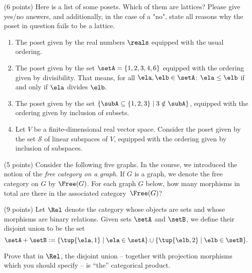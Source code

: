 \documentclass[paper=8.125in:10.250in,pagesize=pdftex,
    headinclude=false,footinclude=false,oneside,egregdoesnotlikesansseriftitles]{kaobook}
\begin{document}
\begin{gradedexercise}\label{ex:LatticeCheck}
(6 points) Here is a list of some posets. Which of them are lattices? 
Please give yes/no answers, and additionally, in the case of a "no", state all reasons why the poset in question fails to be a lattice. 
\begin{enumerate}
\item The poset given by the real numbers $\reals$ equipped with the usual ordering. 
\item The poset given by the set $\setA = \{ 1, 2, 3, 4, 6\}$ equipped with the ordering given by divisibility. That means, for all $\ela, \elb \in \setA$: $\ela \leq \elb$ if and only if $\ela$ divides $\elb.$ 
\item The poset given by the set $\{ \subA \subseteq \{1, 2 , 3 \} \mid 3 \notin \subA \}$, equipped with the ordering given by inclusion of subsets. 
\item Let $V$ be a finite-dimensional real vector space. Consider the poset given by the set $\mathcal{S}$ of linear subspaces of $V$, equipped with the ordering given by inclusion of subspaces. 
\end{enumerate}
\end{gradedexercise}


\newpage

\begin{gradedexercise}\label{ex:FreeCatOnGraph}
(5 points) Consider the following five graphs. In the course, we introduced the notion of the \emph{free category on a graph}. If $G$ is a graph, we denote the free category on $G$ by $\Free(G)$. For each graph $G$ below, how many morphisms in total are there in the associated category~$\Free(G)$?

  \begin{center}
  \end{center}
\end{gradedexercise}


\newpage


\begin{gradedexercise}\label{ex:DirectSumProd}
(9 points) Let $\Rel$ denote the category whose objects are sets and whose morphisms are binary relations. Given sets $\setA$ and $\setB$, we define their disjoint union to be the set
$$
\setA + \setB := \{ \tup{\ela, 1} \mid \ela \in \setA \} \cup \{ \tup{\elb, 2} \mid \elb \in \setB \}.
$$

Prove that in $\Rel$, the disjoint union -- together with projection morphisms which you should specify -- is ``the'' categorical product. 
\end{gradedexercise}
\end{document}
